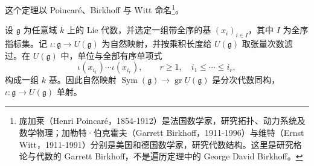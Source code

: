 这个定理以 Poincaré、Birkhoff 与 Witt 命名\footnote{庞加莱（Henri Poincaré，1854-1912）是法国数学家，研究拓扑、动力系统及数学物理；加勒特·伯克霍夫（Garrett Birkhoff，1911-1996）与维特（Ernst Witt，1911-1991）分别是美国和德国数学家，研究代数结构。这里是研究格论与代数的 Garrett Birkhoff，不是遍历定理中的 George David Birkhoff。}。
\begin{theorem}\label{b5:thm:pbw}
	设 \(\mathfrak g\) 为任意域 \(k\) 上的 Lie 代数，并选定一组带全序的基 \((x_i)_{i\in I}\)，其中 \(I\) 为全序指标集。记 \(\iota:\mathfrak g\to U(\mathfrak g)\) 为自然映射，并按乘积长度给 \(U(\mathfrak g)\) 取张量次数滤过。在 \(U(\mathfrak g)\) 中，单位与全部有序单项式
	\[
		\iota(x_{i_1})\cdots\iota(x_{i_r}), \qquad r\ge1,\quad i_1\le\cdots\le i_r,
	\]
	构成一组 \(k\) 基。因此自然映射 \(\operatorname{Sym}(\mathfrak g)\to\operatorname{gr}U(\mathfrak g)\) 是分次代数同构，\(\iota:\mathfrak g\to U(\mathfrak g)\) 单射。
\end{theorem}
